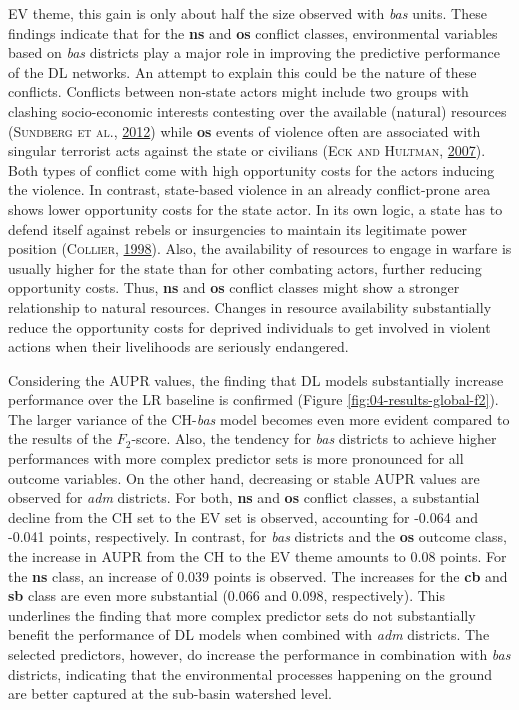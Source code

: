 \documentclass[a4paper,11pt]{article}
\begin{document}
EV theme, this gain is only about half the size observed with \emph{bas} units. These
findings indicate that for the \textbf{ns} and \textbf{os} conflict classes, environmental
variables based on \emph{bas} districts play a major role in improving the predictive
performance of the DL networks. An attempt to explain this could be the nature of
these conflicts. Conflicts between non-state actors might include two groups with
clashing socio-economic interests contesting over the available (natural) resources
\textsc{(\textnormal{\textsc{Sundberg} \textsc{et al.}}, \textnormal{\protect\hyperlink{ref-sundberg2012}{2012}})} while \textbf{os} events of violence often are associated with singular
terrorist acts against the state or civilians \textsc{(\textnormal{\textsc{Eck} and \textsc{Hultman}}, \textnormal{\protect\hyperlink{ref-eck2007}{2007}})}. Both types of conflict
come with high opportunity costs for the actors inducing the violence. In contrast,
state-based violence in an already conflict-prone area shows lower opportunity
costs for the state actor. In its own logic, a state has to defend itself against
rebels or insurgencies to maintain its legitimate power position \textsc{(\textnormal{\textsc{Collier}}, \textnormal{\protect\hyperlink{ref-collier1998}{1998}})}.
Also, the availability of resources to engage in warfare is usually higher for the state
than for other combating actors, further reducing opportunity costs. Thus,
\textbf{ns} and \textbf{os} conflict classes might show a stronger relationship to natural
resources. Changes in resource availability substantially reduce the opportunity
costs for deprived individuals to get involved in violent actions when their livelihoods are seriously endangered.

Considering the AUPR values, the finding that DL models substantially increase
performance over the LR baseline is confirmed (Figure \ref{fig:04-results-global-f2}).
The larger variance of the CH-\emph{bas} model becomes even more evident compared to
the results of the \(F_2\)-score. Also, the tendency for \emph{bas} districts to achieve
higher performances with more complex predictor sets is more pronounced for all
outcome variables. On the other hand, decreasing or stable AUPR values are
observed for \emph{adm} districts. For both, \textbf{ns} and \textbf{os} conflict classes,
a substantial decline from the CH set to the EV set is observed, accounting for -0.064
and -0.041 points, respectively. In contrast, for \emph{bas} districts and the \textbf{os}
outcome class, the increase in AUPR from the CH to the EV theme amounts to 0.08
points. For the \textbf{ns} class, an increase of 0.039 points is observed. The
increases for the \textbf{cb} and \textbf{sb} class are even more substantial (0.066 and 0.098,
respectively). This underlines the finding that more complex predictor sets do
not substantially benefit the performance of DL models when combined with \emph{adm}
districts. The selected predictors, however, do increase the performance in
combination with \emph{bas} districts, indicating that the environmental processes
happening on the ground are better captured at the sub-basin watershed level.
\end{document}
